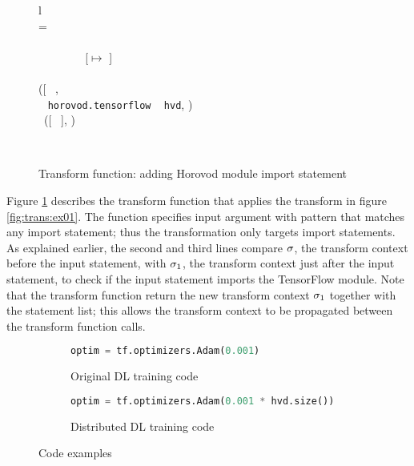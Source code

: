 \begin{figure}[ht!]
  \centering
  \noindent
  \begin{tabular}{l}
   \\
   \tstmt{\kimport ~ \mul{\nalias}}{\smodenv} = \\
    \inden \ktlet ~  ~ \kteq ~ \taalias{\mul{\nalias}}{\smodenv} \ktin \\
    \inden \ktif ~  ~ \envsub ~ \smodenv ~ \kteq ~ [\tflow $\mapsto$ \nid]\\ 
    \inden\ktthen \\
    \inden\hspace{1em} ([\kimport ~ \mul{\nalias}, \\
    \inden\hspace{1em} \kimport ~ {\tt horovod.tensorflow} \kas ~ {\tt hvd}, )\\
    \inden \ktelse~([\kimport ~ \mul{\nalias}], )
  \end{tabular}\\\vpar
  \caption{Transform function: adding Horovod module import statement}
  \label{fig:trans:fn01}
\end{figure}

Figure \ref{fig:trans:fn01} describes the transform function that applies the
transform in figure \ref{fig:trans:ex01}. 
The function specifies input argument with pattern that matches any import
statement; thus the transformation only targets import statements.
As explained earlier, the second and third lines
compare $\sigma$, the transform context
before the input statement, with $\sigma_{1}$, the transform context
just after the input statement, to check if the input statement
imports the TensorFlow module.
Note that the transform function return the new transform context
$\sigma_{1}$ together with the statement list; this allows the 
transform context to be propagated between the transform function calls.

\begin{figure}[ht!]
  \centering
  \begin{subfigure}[t]{0.48\textwidth}
    \begin{lstlisting}[language=Python]
optim = tf.optimizers.Adam(0.001)\end{lstlisting}
    \caption{Original DL training code}
  \end{subfigure}
  \hspace{5mm}
  \begin{subfigure}[t]{0.48\textwidth}
    \begin{lstlisting}[language=Python]
optim = tf.optimizers.Adam(0.001 * hvd.size())\end{lstlisting}
    \caption{Distributed DL training code}
  \end{subfigure}
  \caption{Code examples}
  \label{fig:trans:ex02}
\end{figure}

